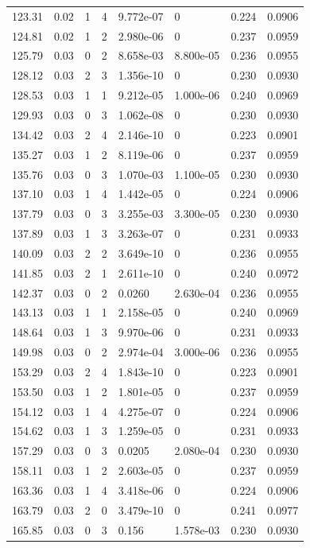 \documentclass[preview]{standalone}
\begin{document}
{{{\begin{tabular}{L{1.2cm}C{1.2cm} C{0.3cm}C{0.5cm} C{1.4cm}C{1.4cm} C{1.4cm}C{1.4cm}}
  123.31  &  0.02  & 1     &  4 &  9.772e-07  & 0  & 0.224 &  0.0906   \\ 
  124.81  &  0.02  & 1     &  2 &  2.980e-06  & 0  & 0.237 &  0.0959   \\ 
  125.79  &  0.03  & 0     &  2 &  8.658e-03  & 8.800e-05  & 0.236 &  0.0955   \\ 
  128.12  &  0.03  & 2     &  3 &  1.356e-10  & 0  & 0.230 &  0.0930   \\ 
  128.53  &  0.03  & 1     &  1 &  9.212e-05  & 1.000e-06  & 0.240 &  0.0969   \\ 
  129.93  &  0.03  & 0     &  3 &  1.062e-08  & 0  & 0.230 &  0.0930   \\ 
  134.42  &  0.03  & 2     &  4 &  2.146e-10  & 0  & 0.223 &  0.0901   \\ 
  135.27  &  0.03  & 1     &  2 &  8.119e-06  & 0  & 0.237 &  0.0959   \\ 
  135.76  &  0.03  & 0     &  3 &  1.070e-03  & 1.100e-05  & 0.230 &  0.0930   \\ 
  137.10  &  0.03  & 1     &  4 &  1.442e-05  & 0  & 0.224 &  0.0906   \\ 
  137.79  &  0.03  & 0     &  3 &  3.255e-03  & 3.300e-05  & 0.230 &  0.0930   \\ 
  137.89  &  0.03  & 1     &  3 &  3.263e-07  & 0  & 0.231 &  0.0933   \\ 
  140.09  &  0.03  & 2     &  2 &  3.649e-10  & 0  & 0.236 &  0.0955   \\ 
  141.85  &  0.03  & 2     &  1 &  2.611e-10  & 0  & 0.240 &  0.0972   \\ 
  142.37  &  0.03  & 0     &  2 &  0.0260  & 2.630e-04  & 0.236 &  0.0955   \\ 
  143.13  &  0.03  & 1     &  1 &  2.158e-05  & 0  & 0.240 &  0.0969   \\ 
  148.64  &  0.03  & 1     &  3 &  9.970e-06  & 0  & 0.231 &  0.0933   \\ 
  149.98  &  0.03  & 0     &  2 &  2.974e-04  & 3.000e-06  & 0.236 &  0.0955   \\ 
  153.29  &  0.03  & 2     &  4 &  1.843e-10  & 0  & 0.223 &  0.0901   \\ 
  153.50  &  0.03  & 1     &  2 &  1.801e-05  & 0  & 0.237 &  0.0959   \\ 
  154.12  &  0.03  & 1     &  4 &  4.275e-07  & 0  & 0.224 &  0.0906   \\ 
  154.62  &  0.03  & 1     &  3 &  1.259e-05  & 0  & 0.231 &  0.0933   \\ 
  157.29  &  0.03  & 0     &  3 &  0.0205  & 2.080e-04  & 0.230 &  0.0930   \\ 
  158.11  &  0.03  & 1     &  2 &  2.603e-05  & 0  & 0.237 &  0.0959   \\ 
  163.36  &  0.03  & 1     &  4 &  3.418e-06  & 0  & 0.224 &  0.0906   \\ 
  163.79  &  0.03  & 2     &  0 &  3.479e-10  & 0  & 0.241 &  0.0977   \\ 
  165.85  &  0.03  & 0     &  3 &  0.156  & 1.578e-03  & 0.230 &  0.0930   \\ 
\hline 
\end{tabular} 

}}}
\end{document}
